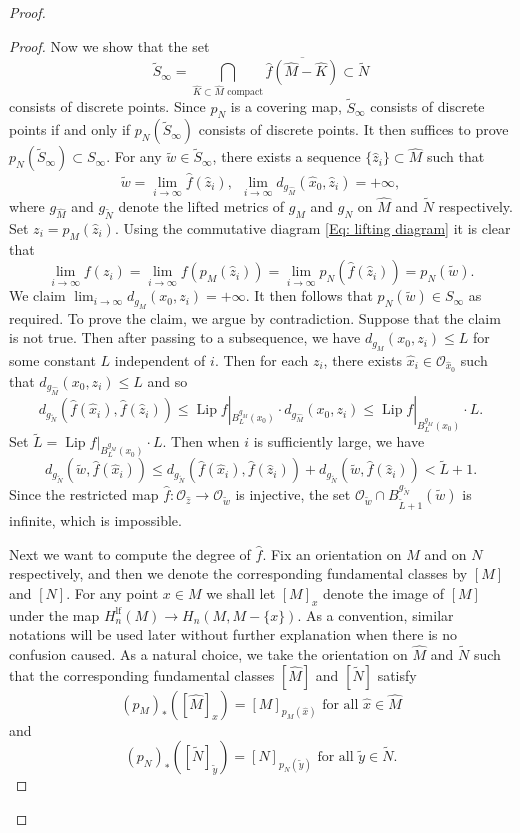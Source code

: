 \documentclass[11pt,letterpaper]{amsart}
\numberwithin{equation}{section}
\theoremstyle{definition}
\DeclareMathOperator{\Lip}{Lip}
\begin{document}
\begin{proof}
\begin{proof}
Now we show that the set
$$
\tilde S_\infty=\bigcap_{\widehat K\subset \widehat M \text{ compact}} \overline{\hat f(\widehat M- \widehat K)} \subset \tilde N
$$
consists of discrete points. Since $p_N$ is a covering map, $\tilde S_\infty$ consists of discrete points if and only if $p_N(\tilde S_\infty)$ consists of discrete points. It then suffices to prove $p_N(\tilde S_\infty)\subset S_\infty$. For any $\tilde{w}\in\tilde S_\infty$, there exists a sequence $\{\hat{z}_{i}\}\subset\widehat{M}$ such that
\[
\tilde{w} = \lim_{i\to\infty}\hat{f}(\hat{z}_{i}), \ \
\lim_{i\to\infty}d_{g_{\widehat{M}}}(\hat{x}_{0},\hat{z}_{i}) = +\infty,
\]
where $g_{\widehat{M}}$ and $g_{\tilde{N}}$ denote the lifted metrics of $g_{M}$ and $g_{N}$ on $\widehat{M}$ and $\tilde{N}$ respectively. Set $z_{i}=p_{M}(\hat{z}_{i})$. Using the commutative diagram \eqref{Eq: lifting diagram} it is clear that
\[
\lim_{i\to\infty}f(z_{i})
= \lim_{i\to\infty}f(p_{M}(\hat{z}_{i}))
= \lim_{i\to\infty}p_{N}(\hat{f}(\hat{z}_{i}))
= p_{N}(\tilde{w}).
\]
We claim $\lim_{i\to\infty}d_{g_{M}}(x_{0},z_{i})=+\infty$. It then follows that $p_{N}(\tilde{w})\in S_\infty$ as required. To prove the claim, we argue by contradiction. Suppose that the claim is not true. Then after passing to a subsequence, we have $d_{g_{M}}(x_{0},z_{i})\leq L$ for some constant $L$ independent of $i$. Then for each $z_{i}$, there exists $\hat{x}_{i}\in\mathcal{O}_{\hat{x}_{0}}$ such that $d_{g_{\widehat{M}}}(x_{0},z_{i})\leq L$ and so
\[
d_{g_{\tilde{N}}}(\hat{f}(\hat{x}_{i}),\hat{f}(\hat{z}_{i}))
\leq \Lip f|_{B_{L}^{g_{M}}(x_{0})}\cdot d_{g_{\widehat{M}}}(x_{0},z_{i})
\leq \Lip f|_{B_{L}^{g_{M}}(x_{0})}\cdot L.
\]
Set $\tilde{L}=\Lip f|_{B_{L}^{g_{M}}(x_{0})}\cdot L$. Then when $i$ is sufficiently large, we have
\[
d_{g_{\tilde{N}}}(\tilde{w},\hat{f}(\hat{x}_{i}))
\leq d_{g_{\tilde{N}}}(\hat{f}(\hat{x}_{i}),\hat{f}(\hat{z}_{i}))+d_{g_{\tilde{N}}}(\tilde{w},\hat{f}(\hat{z}_{i}))
< \tilde{L}+1.
\]
Since the restricted map $\hat f:\mathcal O_{\hat z}\to \mathcal O_{\tilde w}$ is injective, the set $\mathcal{O}_{\tilde{w}}\cap B_{\tilde{L}+1}^{g_{\tilde{N}}}(\tilde{w})$ is infinite, which is impossible.

Next we want to compute the degree of $\hat f$.
Fix an orientation on $M$ and on $N$ respectively, and then we denote the corresponding fundamental classes by $[M]$ and $[N]$. For any point $x\in M$ we shall let $[M]_x$ denote the image of $[M]$ under the map $H_n^{\mathrm{lf}}(M)\to H_n(M,M-\{x\})$. As a convention, similar notations will be used later without further explanation when there is no confusion caused. As a natural choice, we take the orientation on $\widehat M$ and $\tilde N$ such that the corresponding fundamental classes $[\widehat M]$ and $[\tilde N]$ satisfy
$$
(p_M)_{*}([\widehat M]_{\hat x})=[M]_{p_M(\hat x)} \mbox{ for all }\hat x\in \widehat M
$$
and
$$
(p_N)_{*}([\tilde N]_{\tilde y})=[N]_{p_N(\tilde y)} \mbox{ for all }\tilde y\in \tilde N.
$$


\end{proof}
\end{proof}
\end{document}
